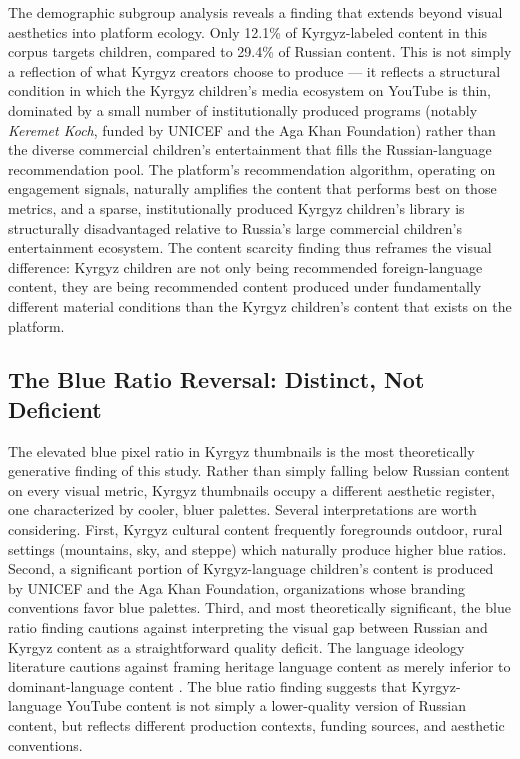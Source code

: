 \documentclass[12pt, letterpaper]{article}
\begin{document}
The demographic subgroup analysis reveals a finding that extends beyond visual aesthetics into platform ecology. Only 12.1\% of Kyrgyz-labeled content in this corpus targets children, compared to 29.4\% of Russian content. This is not simply a reflection of what Kyrgyz creators choose to produce — it reflects a structural condition in which the Kyrgyz children's media ecosystem on YouTube is thin, dominated by a small number of institutionally produced programs (notably \textit{Keremet Koch}, funded by UNICEF and the Aga Khan Foundation) rather than the diverse commercial children's entertainment that fills the Russian-language recommendation pool. The platform's recommendation algorithm, operating on engagement signals, naturally amplifies the content that performs best on those metrics, and a sparse, institutionally produced Kyrgyz children's library is structurally disadvantaged relative to Russia's large commercial children's entertainment ecosystem. The content scarcity finding thus reframes the visual difference: Kyrgyz children are not only being recommended foreign-language content, they are being recommended content produced under fundamentally different material conditions than the Kyrgyz children's content that exists on the platform.

\subsection{The Blue Ratio Reversal: Distinct, Not Deficient}

The elevated blue pixel ratio in Kyrgyz thumbnails is the most theoretically generative finding of this study. Rather than simply falling below Russian content on every visual metric, Kyrgyz thumbnails occupy a different aesthetic register, one characterized by cooler, bluer palettes. Several interpretations are worth considering. First, Kyrgyz cultural content frequently foregrounds outdoor, rural settings (mountains, sky, and steppe) which naturally produce higher blue ratios. Second, a significant portion of Kyrgyz-language children's content is produced by UNICEF and the Aga Khan Foundation, organizations whose branding conventions favor blue palettes. Third, and most theoretically significant, the blue ratio finding cautions against interpreting the visual gap between Russian and Kyrgyz content as a straightforward quality deficit. The language ideology literature cautions against framing heritage language content as merely inferior to dominant-language content \citep{woolard1998, irvine2000}. The blue ratio finding suggests that Kyrgyz-language YouTube content is not simply a lower-quality version of Russian content, but reflects different production contexts, funding sources, and aesthetic conventions.
\end{document}
